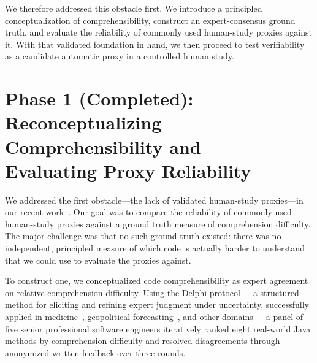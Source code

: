 \documentclass[sigplan,10pt,anonymous=false]{acmart}
\begin{document}
We therefore addressed this obstacle first.
We introduce a principled conceptualization of comprehensibility, construct
an expert-consensus ground truth, and evaluate the reliability of commonly
used human-study proxies against it.
With that validated foundation in hand, we then proceed to test verifiability
as a candidate automatic proxy in a controlled human study.

\section{Phase 1 (Completed): Reconceptualizing Comprehensibility and\\
Evaluating Proxy Reliability}

We addressed the first obstacle---the lack of validated human-study
proxies---in our recent work~\cite{arvan2026reliability}.
Our goal was to compare the reliability of commonly used human-study proxies
against a ground truth measure of comprehension difficulty.
The major challenge was that no such ground truth existed: there was no
independent, principled measure of which code is actually harder to understand
that we could use to evaluate the proxies against.

To construct one, we conceptualized code comprehensibility as expert agreement
on relative comprehension difficulty.
Using the Delphi protocol~\cite{delphi,delphiOriginal,randManual}---a
structured method for eliciting and refining expert judgment under
uncertainty, successfully applied in medicine~\cite{m1,m2,m3,m4},
geopolitical forecasting~\cite{g1,g2}, and other domains~\cite{e1,o1}---a
panel of five senior professional software engineers iteratively ranked eight
real-world Java methods by comprehension difficulty and resolved disagreements
through anonymized written feedback over three rounds.
\end{document}
